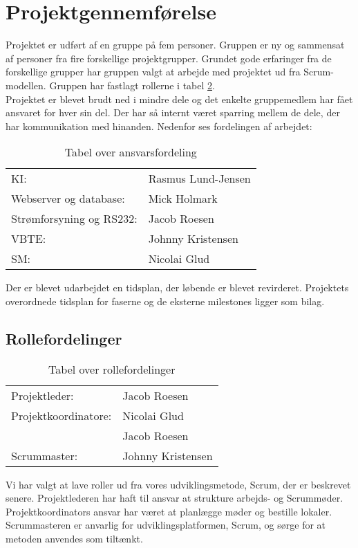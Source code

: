 \section{Projektgennemførelse}
Projektet er udført af en gruppe på fem personer. Gruppen er ny og sammensat af personer fra fire forskellige projektgrupper. Grundet gode erfaringer fra de forskellige grupper har gruppen valgt at arbejde med projektet ud fra Scrum-modellen. Gruppen har fastlagt rollerne i tabel \ref{table:roller}. \\
Projektet er blevet brudt ned i mindre dele og det enkelte gruppemedlem har fået ansvaret for hver sin del. Der har så internt været sparring mellem de dele, der har kommunikation med hinanden. Nedenfor ses fordelingen af arbejdet:
\begin{table}[H]
\centering
\begin{tabular}{ll}
KI: 						&Rasmus Lund-Jensen\\
Webserver og database: 		& Mick Holmark\\
Strømforsyning og RS232:	&Jacob Roesen\\
VBTE: 						&Johnny Kristensen\\
SM: 						&Nicolai Glud\\
\end{tabular}
\caption{Tabel over ansvarsfordeling}
\label{table:ansvar}
\end{table}
Der er blevet udarbejdet en tidsplan, der løbende er blevet revirderet. Projektets overordnede tidsplan for faserne og de eksterne milestones ligger som bilag.\\
\subsection{Rollefordelinger}
\begin{table}[H]
\centering
\begin{tabular}{ll}
Projektleder: 			&Jacob Roesen\\
Projektkoordinatore: 	&Nicolai Glud\\
						&Jacob Roesen\\
Scrummaster: 			&Johnny Kristensen\\
\end{tabular}
\caption{Tabel over rollefordelinger}
\label{table:roller}
\end{table}
Vi har valgt at lave roller ud fra vores udviklingsmetode, Scrum, der er beskrevet senere. Projektlederen har haft til ansvar at strukture arbejds- og Scrummøder. Projektkoordinators ansvar har været at planlægge møder og bestille lokaler. Scrummasteren er anvarlig for udviklingsplatformen, Scrum, og sørge for at metoden anvendes som tiltænkt. 